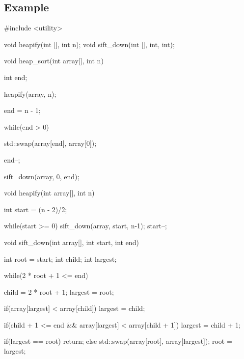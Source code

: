\documentclass{report}
\begin{document}
    \subsection{Example}
    \bigbreak \noindent 
    \begin{cppcode}
#include <utility>

void heapify(int [], int n);
void sift_down(int [], int, int);

void heap_sort(int array[], int n) {
	int end;
	
	heapify(array, n);
	
	end = n - 1;
	
	while(end > 0) {
		std::swap(array[end], array[0]);
		
		end--;
		
		sift_down(array, 0, end);
	}
}

void heapify(int array[], int n) {
	int start = (n - 2)/2;
	
	while(start >= 0) {
		sift_down(array, start, n-1);
		start--;
	}
}

void sift_down(int array[], int start, int end) {
	int root = start;
	int child;
	int largest;
	
	while(2 * root + 1 <= end) {
		child = 2 * root + 1;
		largest = root;
		
		if(array[largest] < array[child]) {
			largest = child;
		}
		
		if(child + 1 <= end && array[largest] < array[child + 1]) {
			largest = child + 1;
		}
		
		if(largest == root) {
			return;
		} else {
			std::swap(array[root], array[largest]);
			root = largest;
		}
	}
}
    \end{cppcode}
    

    







    
    
\end{document}
